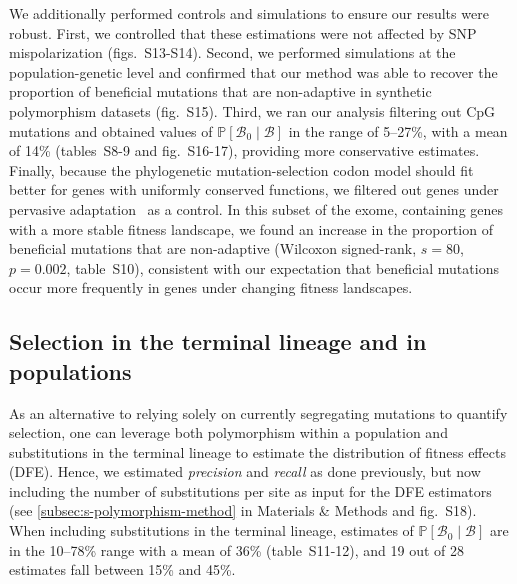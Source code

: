 \documentclass{article}
\newcommand{\proba}{\mathbb{P}}
\newcommand{\SphyBen}{\mathcal{B}_0}
\newcommand{\given}{\mid}
\newcommand{\SpopBen}{\mathcal{B}}
\begin{document}
    We additionally performed controls and simulations to ensure our results were robust.
    First, we controlled that these estimations were not affected by SNP mispolarization (figs.~S13-S14).
    Second, we performed simulations at the population-genetic level and confirmed that our method was able to recover the proportion of beneficial mutations that are non-adaptive in synthetic polymorphism datasets (fig.~S15).
    Third, we ran our analysis filtering out CpG mutations and obtained values of $\proba [ \SphyBen \given \SpopBen]$ in the range of 5--27\%, with a mean of 14\% (tables~S8-9 and fig.~S16-17), providing more conservative estimates.
    Finally, because the phylogenetic mutation-selection codon model should fit better for genes with uniformly conserved functions, we filtered out genes under pervasive adaptation~\cite{latrille_genes_2023} as a control.
    In this subset of the exome, containing genes with a more stable fitness landscape, we found an increase in the proportion of beneficial mutations that are non-adaptive (Wilcoxon signed-rank, $s=80$, $p=0.002$, table~S10), consistent with our expectation that beneficial mutations occur more frequently in genes under changing fitness landscapes.

    \subsection*{Selection in the terminal lineage and in populations}

    As an alternative to relying solely on currently segregating mutations to quantify selection, one can leverage both polymorphism within a population and substitutions in the terminal lineage to estimate the distribution of fitness effects (DFE).
    Hence, we estimated \textit{precision} and \textit{recall} as done previously, but now including the number of substitutions per site as input for the DFE estimators (see \ref{subsec:s-polymorphism-method} in Materials \& Methods and fig.~S18).
    When including substitutions in the terminal lineage, estimates of $\proba [ \SphyBen \given \SpopBen]$ are in the 10--78\% range with a mean of 36\% (table~S11-12), and 19 out of 28 estimates fall between 15\% and 45\%.
\end{document}
